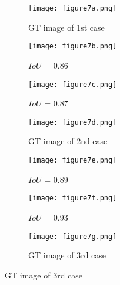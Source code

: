 \onecolumn
\begin{figure}
	\centering
	\begin{subfigure}[b]{0.32\textwidth}
		\centering
		\texttt{[image: figure7a.png]}
		\caption{\centering GT image of 1st case}
		\label{fig:num_GT_391}
	\end{subfigure}
	\hfill
	\begin{subfigure}[b]{0.32\textwidth}
		\centering
		\texttt{[image: figure7b.png]} 
		\caption{\centering \(IoU\) = 0.86}
		\label{fig:Convlstm_num_391}
	\end{subfigure}
	\hfill
	\begin{subfigure}[b]{0.32\textwidth}
		\centering
		\texttt{[image: figure7c.png]}
		\caption{\centering \(IoU\) =  0.87}
		\label{fig:AE_num_391}
	\end{subfigure}
	\par\medskip
	\begin{subfigure}[b]{0.32\textwidth}
		\centering
		\texttt{[image: figure7d.png]}
		\caption{\centering GT image of 2nd case}
		\label{fig:num_GT_462}
	\end{subfigure}
	\hfill
	\begin{subfigure}[b]{0.32\textwidth}
		\centering
		\texttt{[image: figure7e.png]}
		\caption{\centering \(IoU\) = 0.89}
		\label{fig:Convlstm_num_462}
	\end{subfigure}
	\hfill
	\begin{subfigure}[b]{0.32\textwidth}
		\centering
		\texttt{[image: figure7f.png]}
		\caption{\centering \(IoU\) = 0.93}
		\label{fig:AE_num_462}
	\end{subfigure}
	\par\medskip
	\begin{subfigure}[b]{0.32\textwidth}
		\centering
		\texttt{[image: figure7g.png]}
		\caption{\centering GT image of 3rd case}
		\label{fig:num_GT_453}

\end{subfigure}
\end{figure}
